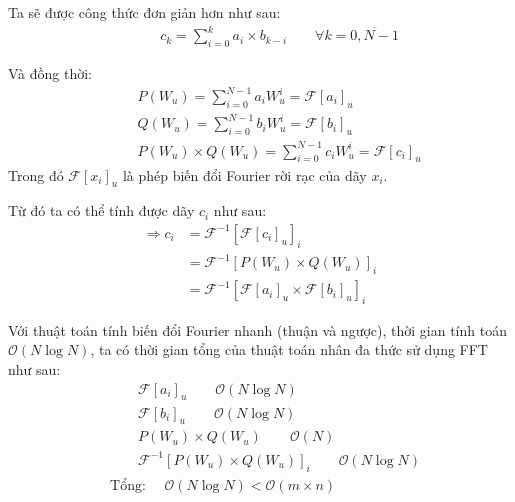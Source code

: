 \documentclass[../report.tex]{subfiles}
\begin{document}
\noindent Ta sẽ được công thức đơn giản hơn như sau: 
\begin{align*}
    &\quad\quad c_k = \sum_{i = 0} ^ {k} a_i \times b_{k - i}
    \quad\quad \forall k = \overline{0, N - 1}
\end{align*}

\noindent Và đồng thời: 
\begin{align*}
    &\quad\quad P(W_u) = \sum_{i = 0}^{N - 1} a_i W_u^i 
    = \mathcal{F}[a_i]_u \\
    &\quad\quad Q(W_u) = \sum_{i = 0}^{N - 1} b_i W_u^i 
    = \mathcal{F}[b_i]_u \\
    &\quad\quad P(W_u) \times Q(W_u) = \sum_{i = 0}^{N - 1} c_i W_u^i
    = \mathcal{F}[c_i]_u
\end{align*}
Trong đó $\mathcal{F}[x_i]_u$ là phép biến đổi Fourier rời rạc của 
dãy $x_i$.

\noindent Từ đó ta có thể tính được dãy $c_i$ như sau:
\begin{align*}
    \Rightarrow c_i 
    &= \mathcal{F}^{-1} \left[ \mathcal{F}[c_i]_u \right]_i \\
    &= \mathcal{F}^{-1} \left[ P(W_u) \times Q(W_u) \right]_i \\
    &= \mathcal{F}^{-1} \left[ 
        \mathcal{F}[a_i]_u \times
        \mathcal{F}[b_i]_u \right]_i
\end{align*}

Với thuật toán tính biến đổi Fourier nhanh (thuận và ngược),
thời gian tính toán $\mathcal{O}(N \log N)$, ta có thời gian 
tổng của thuật toán nhân đa thức sử dụng FFT như sau: 
\begin{align*}
    &\quad\quad \mathcal{F}[a_i]_u \quad\quad \mathcal{O}(N \log N) \\
    &\quad\quad \mathcal{F}[b_i]_u \quad\quad \mathcal{O}(N \log N) \\
    &\quad\quad P(W_u) \times Q(W_u) \quad\quad \mathcal{O}(N) \\
    &\quad\quad \mathcal{F}^{-1}[P(W_u) \times Q(W_u)]_i 
    \quad\quad \mathcal{O}(N \log N) \\
    &\textrm{Tổng: } \quad \mathcal{O}(N \log N) < 
                \mathcal{O}\left(m \times n\right)
\end{align*}
\end{document}
